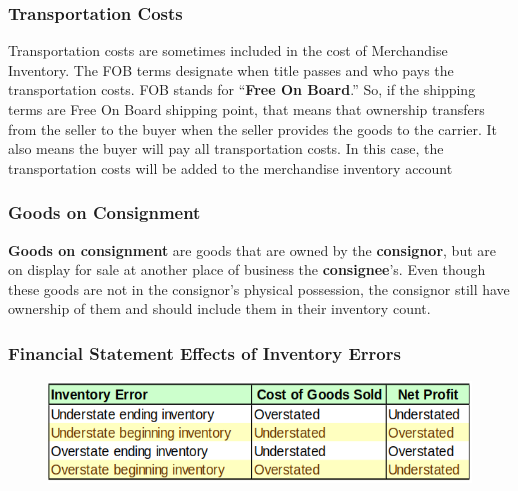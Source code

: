 \documentclass[../main.tex]{subfiles}
\begin{document}
	\subsubsection{Transportation Costs}
	
	Transportation costs are sometimes included in the cost of Merchandise 
	Inventory. The FOB terms designate when title passes and who pays the 
	transportation costs. FOB stands for “\textbf{Free On Board}.”  So, if the 
	shipping terms are Free On Board shipping point, that means that ownership 
	transfers from the seller to the buyer when the seller provides the goods 
	to the carrier.  It also means the buyer will pay all transportation 
	costs.  In this case, the transportation costs will be added to the 
	merchandise inventory account
	
	\subsubsection{Goods on Consignment}
	
	\textbf{Goods on consignment} are goods that are owned by the 
	\textbf{consignor}, but are on 
	display for sale at another place of business \ie the \textbf{consignee}’s. 
	Even 
	though these goods are not in the consignor’s physical possession, the 
	consignor still have ownership of them and should include them in their 
	inventory count.
	
	\subsubsection{Financial Statement Effects of Inventory Errors}
	
	\begin{figure}[ht]
		\centering
		\includegraphics[width=\columnwidth]{images/c7/inventory_error_effects.png}
	\end{figure}
	
\end{document}
